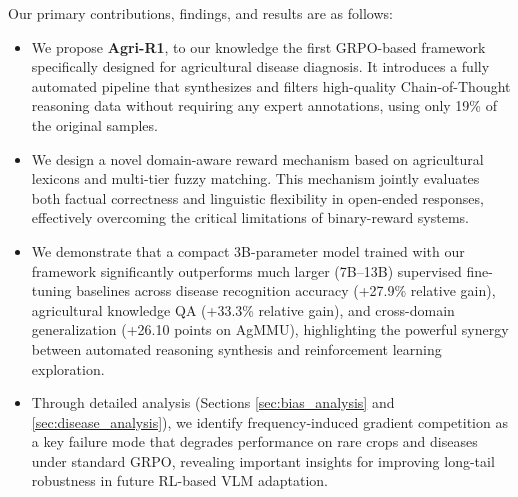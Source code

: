 \documentclass[sigconf,anonymous,review]{acmart}
\begin{document}
Our primary contributions, findings, and results are as follows:
\begin{itemize}
\item We propose \textbf{Agri-R1}, to our knowledge the first GRPO-based framework specifically designed for agricultural disease diagnosis. It introduces a fully automated pipeline that synthesizes and filters high-quality Chain-of-Thought reasoning data without requiring any expert annotations, using only 19\% of the original samples.
\item We design a novel domain-aware reward mechanism based on agricultural lexicons and multi-tier fuzzy matching. This mechanism jointly evaluates both factual correctness and linguistic flexibility in open-ended responses, effectively overcoming the critical limitations of binary-reward systems.
\item We demonstrate that a compact 3B-parameter model trained with our framework significantly outperforms much larger (7B--13B) supervised fine-tuning baselines across disease recognition accuracy (+27.9\% relative gain), agricultural knowledge QA (+33.3\% relative gain), and cross-domain generalization (+26.10 points on AgMMU), highlighting the powerful synergy between automated reasoning synthesis and reinforcement learning exploration.
\item Through detailed analysis (Sections \ref{sec:bias_analysis} and \ref{sec:disease_analysis}), we identify frequency-induced gradient competition as a key failure mode that degrades performance on rare crops and diseases under standard GRPO, revealing important insights for improving long-tail robustness in future RL-based VLM adaptation.
\end{itemize}

\end{document}
